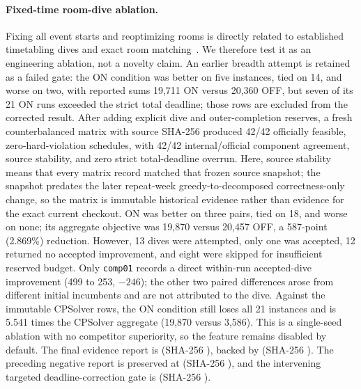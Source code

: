 \paragraph{Fixed-time room-dive ablation.}
Fixing all event starts and reoptimizing rooms is directly related to established timetabling dives and exact room matching~\cite{burke2010diving,lu2008hybrid}.
We therefore test it as an engineering ablation, not a novelty claim.
An earlier breadth attempt is retained as a failed gate: the ON condition was better on five instances, tied on 14, and worse on two, with reported sums 19,711 ON versus 20,360 OFF, but seven of its 21 ON runs exceeded the strict total deadline; those rows are excluded from the corrected result.
After adding explicit dive and outer-completion reserves, a fresh counterbalanced matrix with source SHA-256  produced 42/42 officially feasible, zero-hard-violation schedules, with 42/42 internal/official component agreement, source stability, and zero strict total-deadline overrun.
Here, source stability means that every matrix record matched that frozen source snapshot; the snapshot predates the later repeat-week greedy-to-decomposed correctness-only change, so the matrix is immutable historical evidence rather than evidence for the exact current checkout.
ON was better on three pairs, tied on 18, and worse on none; its aggregate objective was 19,870 versus 20,457 OFF, a 587-point (2.869\%) reduction.
However, 13 dives were attempted, only one was accepted, 12 returned no accepted improvement, and eight were skipped for insufficient reserved budget.
Only \texttt{comp01} records a direct within-run accepted-dive improvement (499 to 253, $-246$); the other two paired differences arose from different initial incumbents and are not attributed to the dive.
Against the immutable CPSolver rows, the ON condition still loses all 21 instances and is 5.541 times the CPSolver aggregate (19,870 versus 3,586).
This is a single-seed ablation with no competitor superiority, so the feature remains disabled by default.
The final evidence report is  (SHA-256 ), backed by  (SHA-256 ).
The preceding negative report is preserved at  (SHA-256 ), and the intervening targeted deadline-correction gate is  (SHA-256 ).

